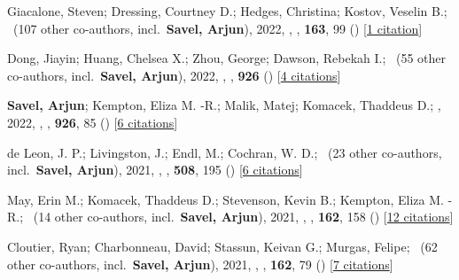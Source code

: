 \item[{\color{numcolor}\scriptsize10}] Giacalone, Steven; Dressing, Courtney D.; Hedges, Christina; Kostov, Veselin B.; \etal\ ({107} other co-authors, incl.\ \textbf{Savel, Arjun}), 2022, , \aj, \textbf{163}, 99 () [\href{https://ui.adsabs.harvard.edu/abs/2022AJ....163...99G}{1 citation}]

\item[{\color{numcolor}\scriptsize9}] Dong, Jiayin; Huang, Chelsea X.; Zhou, George; Dawson, Rebekah I.; \etal\ ({55} other co-authors, incl.\ \textbf{Savel, Arjun}), 2022, , \apj, \textbf{926} () [\href{https://ui.adsabs.harvard.edu/abs/2022ApJ...926L...7D}{4 citations}]

\item[{\color{numcolor}\scriptsize8}] \textbf{Savel, Arjun}; Kempton, Eliza M. -R.; Malik, Matej; Komacek, Thaddeus D.; \etal, 2022, , \apj, \textbf{926}, 85 () [\href{https://ui.adsabs.harvard.edu/abs/2022ApJ...926...85S}{6 citations}]

\item[{\color{numcolor}\scriptsize7}] de Leon, J. P.; Livingston, J.; Endl, M.; Cochran, W. D.; \etal\ ({23} other co-authors, incl.\ \textbf{Savel, Arjun}), 2021, , \mnras, \textbf{508}, 195 () [\href{https://ui.adsabs.harvard.edu/abs/2021MNRAS.508..195D}{6 citations}]

\item[{\color{numcolor}\scriptsize6}] May, Erin M.; Komacek, Thaddeus D.; Stevenson, Kevin B.; Kempton, Eliza M. -R.; \etal\ ({14} other co-authors, incl.\ \textbf{Savel, Arjun}), 2021, , \aj, \textbf{162}, 158 () [\href{https://ui.adsabs.harvard.edu/abs/2021AJ....162..158M}{12 citations}]

\item[{\color{numcolor}\scriptsize5}] Cloutier, Ryan; Charbonneau, David; Stassun, Keivan G.; Murgas, Felipe; \etal\ ({62} other co-authors, incl.\ \textbf{Savel, Arjun}), 2021, , \aj, \textbf{162}, 79 () [\href{https://ui.adsabs.harvard.edu/abs/2021AJ....162...79C}{7 citations}]

